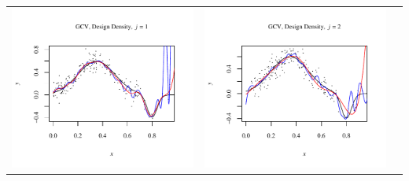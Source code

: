 \documentclass[11pt]{article}
\begin{document}
\begin{table}[h!]
  \begin{center}
    \renewcommand{\arraystretch}{1.5}
    \begin{tabular}{| >{\centering\arraybackslash}m{2.1in} |  >{\centering\arraybackslash}m{2.1in} |  >{\centering\arraybackslash}m{2.1in}|}
      \hline
      \includegraphics[width=1\linewidth,height=0.18\textheight]{Graphs/2/2/assignment5_a_2_2_1}&
      \includegraphics[width=1\linewidth,height=0.18\textheight]{Graphs/2/2/assignment5_a_2_2_2}&

\end{tabular}
\end{center}
\end{table}
\end{document}
